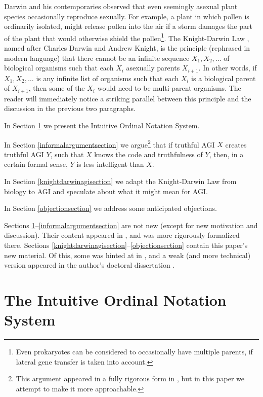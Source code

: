 \documentclass[runningheads]{llncs}
\begin{document}
Darwin and his contemporaries observed that even
seemingly asexual plant species occasionally reproduce sexually.
For example, a plant in which pollen is ordinarily isolated, might
release pollen into the air if a storm damages the part of the
plant that would otherwise shield the pollen\footnote{Even prokaryotes can
be considered to occasionally have multiple parents, if lateral gene
transfer is taken into account.}.
The Knight-Darwin Law \cite{darwin1898knight}, named after Charles Darwin
and Andrew Knight, is the
principle (rephrased in modern language) that there cannot be an infinite
sequence $X_1,X_2,\ldots$ of biological organisms such that each $X_i$ asexually
parents $X_{i+1}$. In other words, if $X_1,X_2,\ldots$ is any infinite list of
organisms such that each $X_i$ is a biological parent of $X_{i+1}$, then some of the
$X_i$ would need to be multi-parent organisms.
The reader will immediately notice a striking parallel between
this principle and the discussion in the previous two paragraphs.

In Section \ref{notationsystemsection} we present the Intuitive Ordinal Notation
System.

In Section \ref{informalargumentsection} we argue\footnote{This argument appeared
in a fully rigorous form in \cite{alexander2019measuring},
but in this paper we attempt to make it more approachable.} that if truthful AGI $X$ creates
truthful AGI $Y$, such that $X$
knows the code and truthfulness of $Y$, then, in a certain formal sense, $Y$ is
less intelligent
than $X$.

In Section \ref{knightdarwinagisection} we adapt the Knight-Darwin Law from biology to AGI
and speculate about what it might mean for AGI.

In Section \ref{objectionsection} we address some anticipated objections.


Sections \ref{notationsystemsection}--\ref{informalargumentsection} are not new
(except for new motivation and discussion). Their content appeared in
\cite{alexander2019measuring}, and was more rigorously formalized there.
Sections \ref{knightdarwinagisection}--\ref{objectionsection} contain this paper's
new material. Of this, some was hinted at in \cite{alexander2019measuring},
and a weak (and more technical) version appeared in the author's
doctoral dissertation \cite{alexanderdissert}.

\section{The Intuitive Ordinal Notation System}
\label{notationsystemsection}
\end{document}
